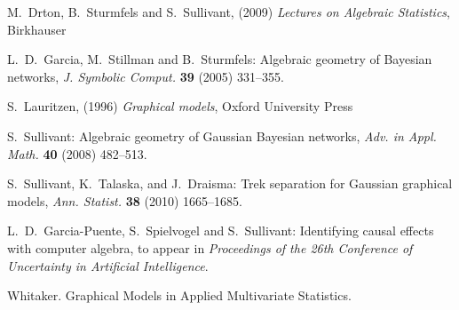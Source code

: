 \documentclass[letterpaper]{article}
\theoremstyle{definition}
\begin{document}
\begin{thebibliography}{20}


M.~Drton, B.~Sturmfels and S.~Sullivant, (2009) \emph{Lectures on Algebraic Statistics}, Birkhauser 


 L.~D.~Garcia, M.~Stillman and B.~Sturmfels: Algebraic geometry of Bayesian networks, {\em J. Symbolic Comput.}
  {\bf 39} (2005) 331--355.
  


S.~Lauritzen,  (1996) \emph{Graphical models}, Oxford University Press


 S.~Sullivant: Algebraic geometry of Gaussian Bayesian
  networks, {\em Adv. in Appl. Math.} {\bf 40} (2008) 482--513.

S.~Sullivant, K.~Talaska, and J.~Draisma: Trek separation for Gaussian
graphical models, {\em Ann. Statist.} {\bf 38} (2010) 1665--1685. 

 L.~D.~Garcia-Puente, S.~Spielvogel and S.~Sullivant: Identifying
causal effects with computer algebra, to appear in {\em Proceedings of the 26th
Conference of Uncertainty in Artificial Intelligence}.

  Whitaker.  Graphical Models in Applied Multivariate Statistics.

\end{thebibliography}
\end{document}
